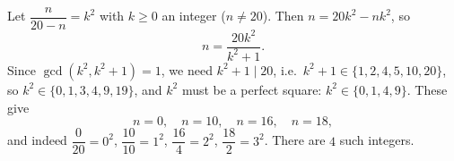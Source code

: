 Let $\dfrac{n}{20-n}=k^2$ with $k\ge0$ an integer ($n\ne20$). Then $n=20k^2-nk^2$, so
\[
n=\dfrac{20k^2}{k^2+1}.
\]
Since $\gcd(k^2,k^2+1)=1$, we need $k^2+1\mid20$, i.e.\ $k^2+1\in\{1,2,4,5,10,20\}$, so $k^2\in\{0,1,3,4,9,19\}$, and $k^2$ must be a perfect square: $k^2\in\{0,1,4,9\}$. These give
\[
n=0,\quad n=10,\quad n=16,\quad n=18,
\]
and indeed $\dfrac{0}{20}=0^2$, $\dfrac{10}{10}=1^2$, $\dfrac{16}{4}=2^2$, $\dfrac{18}{2}=3^2$. There are $\boxed{4}$ such integers.
